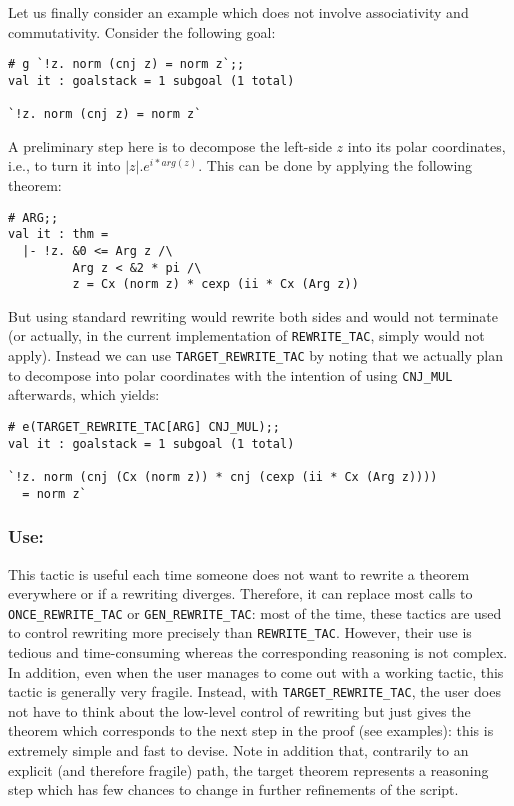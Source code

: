 \documentclass{llncs}
\newcommand*\REWRITETAC{\texttt{REWRITE\_TAC}\xspace}
\newcommand*\ONCETAC{\texttt{ONCE\_REWRITE\_TAC}\xspace}
\newcommand*\GENTAC{\texttt{GEN\_REWRITE\_TAC}\xspace}
\newcommand*\TARGETTAC{\texttt{TARGET\_REWRITE\_TAC}\xspace}
\begin{document}
    \begin{example}
    Let us finally consider an example which does not involve associativity and commutativity.
    Consider the following goal:
    \begin{verbatim}
# g `!z. norm (cnj z) = norm z`;;
val it : goalstack = 1 subgoal (1 total)

`!z. norm (cnj z) = norm z` \end{verbatim}
    A preliminary step here is to decompose the left-side $z$ into its polar coordinates, 
    i.e., to turn it into $|z|.e^{i*arg(z)}$.
    This can be done by applying the following theorem:
    \begin{verbatim}
# ARG;;
val it : thm =
  |- !z. &0 <= Arg z /\
         Arg z < &2 * pi /\
         z = Cx (norm z) * cexp (ii * Cx (Arg z)) \end{verbatim}
    But using standard rewriting would rewrite both sides and would not terminate
    (or actually, in the current implementation of \REWRITETAC, simply would not apply).
    Instead we can use \TARGETTAC by noting that we actually plan to decompose into polar coordinates 
    with the intention of using \texttt{CNJ\_MUL} afterwards, which yields:
    \begin{verbatim}
# e(TARGET_REWRITE_TAC[ARG] CNJ_MUL);;
val it : goalstack = 1 subgoal (1 total)

`!z. norm (cnj (Cx (norm z)) * cnj (cexp (ii * Cx (Arg z)))) 
  = norm z` \end{verbatim}
    \end{example}

    \subsubsection{Use:} This tactic is useful each time someone does not want to rewrite a theorem everywhere
    or if a rewriting diverges.
    Therefore, it can replace most calls to \ONCETAC or \GENTAC:
    most of the time, these tactics are used to control rewriting more precisely than \REWRITETAC.
    However, their use is tedious and time-consuming whereas the corresponding reasoning is not complex.
    In addition, even when the user manages to come out with a working tactic,
    this tactic is generally very fragile.
    Instead, with \TARGETTAC, the user does not have to think about the low-level control of rewriting
    but just gives the theorem which corresponds to the next step in the proof (see examples):
    this is extremely simple and fast to devise.
    Note in addition that, contrarily to an explicit (and therefore fragile) path,
    the target theorem represents a reasoning step which has few chances to change in further refinements
    of the script.
\end{document}
